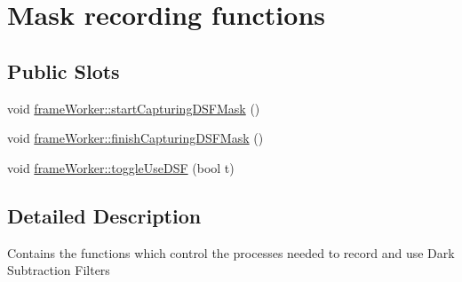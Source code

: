 \hypertarget{group__maskfunc}{\section{Mask recording functions}
\label{group__maskfunc}
}
\subsection*{Public Slots}
\begin{DoxyCompactItemize}
\item 
void \hyperlink{group__maskfunc_ga491bd33995f96dc7ba226385af68fcde}{frame\+Worker\+::start\+Capturing\+D\+S\+F\+Mask} ()
\item 
void \hyperlink{group__maskfunc_gabb47faca8ced962d58dd3e155944405c}{frame\+Worker\+::finish\+Capturing\+D\+S\+F\+Mask} ()
\item 
void \hyperlink{group__maskfunc_ga0c60552b1b0aedbfd7091ce71a16c718}{frame\+Worker\+::toggle\+Use\+D\+S\+F} (bool t)
\end{DoxyCompactItemize}


\subsection{Detailed Description}
Contains the functions which control the processes needed to record and use Dark Subtraction Filters 

